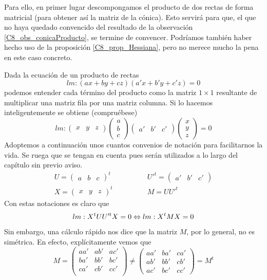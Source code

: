 Para ello, en primer lugar descompongamos el producto de dos rectas de forma matricial (para obtener así la matriz de la cónica). Esto servirá para que, el que no haya quedado convencido del resultado de la observación \ref{C8_obs_conicaProducto}, se termine de convencer. Podríamos también haber hecho uso de la proposición \ref{C8_prop_Hessiana}, pero no merece mucho la pena en este caso concreto.

Dada la ecuación de un producto de rectas
\[lm:(ax+by+cz)(a'x+b'y+c'z)=0\]
podemos entender cada término del producto como la matriz $1\times 1$ resultante de multiplicar una matriz fila por una matriz columna. Si lo hacemos inteligentemente se obtiene (compruébese)
\[lm:\begin{pmatrix}
x & y & z
\end{pmatrix}\begin{pmatrix}
a\\
b\\
c
\end{pmatrix}
\begin{pmatrix}
a' & b' & c'
\end{pmatrix}\begin{pmatrix}
x\\
y\\
z
\end{pmatrix}=0\]
Adoptemos a continuación unos cuantos convenios de notación para facilitarnos la vida. Se ruega que se tengan en cuenta pues serán utilizados a lo largo del capítulo sin previo aviso.
\[\begin{array}{cc}
U=\begin{pmatrix}
a & b & c
\end{pmatrix}^t\qquad&\qquad U'^t=\begin{pmatrix}
a' & b' & c'
\end{pmatrix}\\
X=\begin{pmatrix}
x & y & z
\end{pmatrix}^t\qquad &  \qquad M=UU'^t\end{array}\]
Con estas notaciones es claro que \[lm:X^tUU'^tX=0\Leftrightarrow lm:X^tMX=0\]
Sin embargo, una cálculo rápido nos dice que la matriz $M$, por lo general, no es simétrica. En efecto, explícitamente vemos que
\[M=\begin{pmatrix}
aa' & ab' & ac'\\
ba' & bb' & bc'\\
ca' & cb' & cc'\\
\end{pmatrix}\not=\begin{pmatrix}
aa' & ba' & ca'\\
ab' & bb' & cb'\\
ac' & bc' & cc'
\end{pmatrix}=M^t\]
